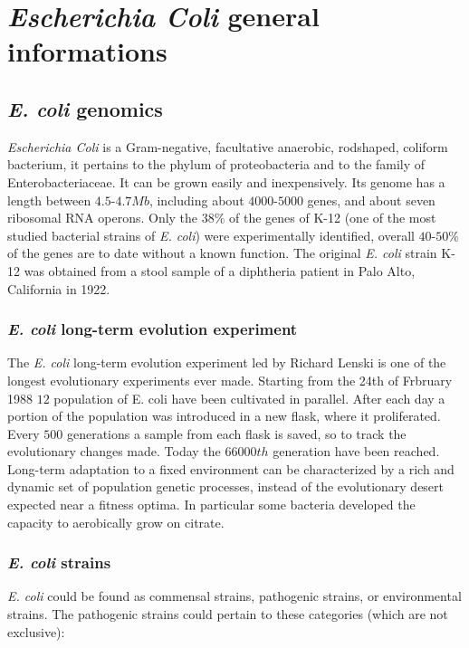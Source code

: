 \graphicspath{{chapters/images/01/}}
\chapter{\emph{Escherichia Coli} general informations}

\section{\emph{E. coli} genomics}
\emph{Escherichia Coli} is a Gram-negative, facultative anaerobic, rodshaped, coliform bacterium, it pertains to the phylum of proteobacteria and to the family of Enterobacteriaceae. It can be grown easily and inexpensively. Its genome has a length between $4.5$-$4.7Mb$, including about $4000$-$5000$ genes, and about seven ribosomal RNA operons. Only the $38\%$ of the genes of K-12 (one of the most studied bacterial strains of \emph{E. coli}) were experimentally identified, overall $40$-$50\%$ of the genes are to date without a known function.
The original \emph{E. coli} strain K-12 was obtained from a stool sample of a diphtheria patient in Palo Alto, California in 1922.

    \subsection{\emph{E. coli} long-term evolution experiment}
    The \emph{E. coli} long-term evolution experiment led by Richard Lenski is one of the longest evolutionary experiments ever made.
    Starting from the 24th of Frbruary 1988 $12$ population of E. coli have been cultivated in parallel.
    After each day a portion of the population was introduced in a new flask, where it proliferated.
    Every $500$ generations a sample from each flask is saved, so to track the evolutionary changes made.
    Today the $66000th$ generation have been reached.
    Long-term adaptation to a fixed environment can be characterized by a rich and dynamic set of population genetic processes, instead of the evolutionary desert expected near a fitness optima.
    In particular some bacteria developed the capacity to aerobically grow on citrate.

    \subsection{\emph{E. coli} strains}
    \emph{E. coli} could be found as commensal strains, pathogenic strains, or environmental strains. The pathogenic strains could pertain to these categories (which are not exclusive):

